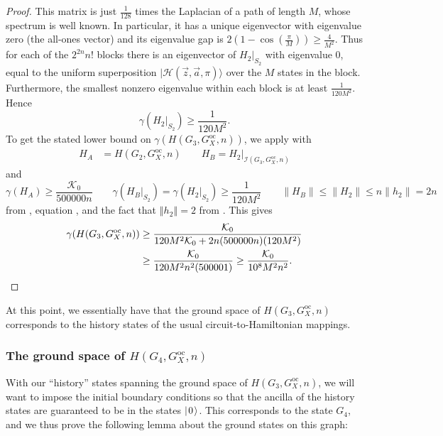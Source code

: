 \documentclass[../thesis-main/thesis-main]{subfiles}
\begin{document}
\begin{proof}
This matrix is just $\frac{1}{128}$ times the Laplacian of a path of length $M$, whose spectrum is well known. In particular, it has a unique eigenvector with eigenvalue zero (the all-ones vector) and its eigenvalue gap is $2(1-\cos (\frac{\pi}{M}))\geq \frac{4}{M^2}$. Thus for each of the $2^{2n}n!$ blocks there is an eigenvector of $H_{2}|_{S_{2}}$ with eigenvalue $0$, equal to the uniform superposition $|\mathcal{H}(\vec{z},\vec{a},\pi)\rangle$ over the $M$ states in the block. Furthermore, the smallest nonzero eigenvalue within each block is at least $\frac{1}{120M^{2}}$. Hence
\begin{equation}
  \gamma(H_{2}|_{S_{2}}) \geq \frac{1}{120M^{2}}.\label{eq:gamma_HB}
\end{equation}
To get the stated lower bound on $\gamma(H(G_{3},G_X^{\text{oc}},n))$, we apply  with 
\begin{align}
  H_{A} &= H(G_{2},G_X^{\text{oc}},n) \qquad H_{B}=H_{2}|_{\mathcal{I}(G_{3},G_X^{\text{oc}},n)}
\end{align}
and 
\begin{equation}
  \gamma(H_{A}) \geq \frac{\mathcal{K}_0}{500000 n} \qquad
  \gamma(H_{B}|_{S_{2}}) = \gamma(H_{2}|_{S_{2}}) 
  \geq \frac{1}{120 M^{2}} \qquad
  \|H_{B}\| \leq \|H_{2}\| \leq n \|h_{2}\| = 2n
\label{eq:gamma_HA}
\end{equation}
from , equation , and the fact that $\left\Vert h_{2}\right\Vert =2$ from . This gives 
\begin{align}
  \gamma(H(G_3,G_X^{\text{oc}},n)) 
  &\geq \frac{\mathcal{K}_0}{120M^2\mathcal{K}_0 +2n(500000n)(120M^2)} \\
  &\geq \frac{\mathcal{K}_0}{120 M^2 n^2(500001)}
   \geq \frac{\mathcal{K}_0}{10^8 M^2 n^2}. \qedhere
\end{align}
\end{proof}

At this point, we essentially have that the ground space of $H(G_3,G_X^{\text{oc}},n)$ corresponds to the history states of the usual circuit-to-Hamiltonian mappings.  

\subsubsection{The ground space of $H(G_4,G_X^{\text{oc}},n)$}

With our ``history'' states spanning the ground space of $H(G_3,G_X^{\text{oc}},n)$, we will want to impose the initial boundary conditions so that the ancilla of the history states are guaranteed to be in the states $|\mspace{2mu} 0 \mspace{2mu} \rangle$.  This corresponds to the state $G_4$, and we thus prove the following lemma about the ground states on this graph:
\end{document}
